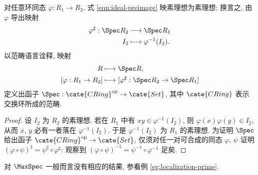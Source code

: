 \begin{lemma}\label{prop:Spec-pullback}
	对任意环同态 $\varphi: R_1 \to R_2$, 式 \eqref{eqn:ideal-preimage} 映素理想为素理想; 换言之, 由 $\varphi$ 导出映射
	\begin{align*}
		\varphi^\sharp: \Spec R_2 & \longrightarrow \Spec R_1 \\
		I_2 & \longmapsto \varphi^{-1}(I_2).
	\end{align*}
	以范畴语言诠释, 映射
	\begin{align*}
		R & \longmapsto \Spec R, \\
		[\varphi: R_1 \to R_2] & \longmapsto [\varphi^\sharp: \Spec R_2 \to \Spec R_1]
	\end{align*}
	定义出函子 $\Spec: \cate{CRing}^\text{op} \to \cate{Set}$, 其中 $\cate{CRing}$ 表示交换环所成的范畴.
\end{lemma}
\begin{proof}
	设 $I_2$ 为 $R_2$ 的素理想. 若在 $R_1$ 中有 $xy \in \varphi^{-1}(I_2)$, 则 $\varphi(x)\varphi(y) \in I_2$, 从而 $x$, $y$ 必有一者落在 $\varphi^{-1}(I_2)$. 于是 $\varphi^{-1}(I_2)$ 为 $R_1$ 的素理想. 为证明 $\Spec$ 给出函子 $\cate{CRing}^\text{op} \to \cate{Set}$, 仅须对任一对可合成的同态 $\varphi$, $\psi$ 证明 $(\varphi \circ \psi)^\sharp = \psi^\sharp \circ \varphi^\sharp$: 观察到 $(\varphi \circ \psi)^{-1} = \psi^{-1} \circ \varphi^{-1}$ 足矣.
\end{proof}

\begin{remark}
	对 $\MaxSpec$ 一般而言没有相应的结果, 参看例 \ref{eg:localization-prime}.
\end{remark}

